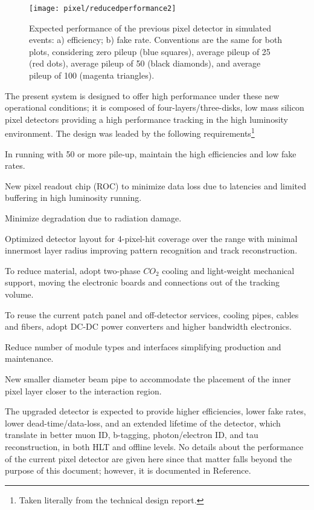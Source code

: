 \begin{figure}[!h]
\centering
\texttt{[image: pixel/reducedperformance2]}
\caption[Expected performance of the previous pixel detector in simulated \ttbar events.]{Expected performance of the previous pixel detector in simulated \ttbar events: a) efficiency; b) fake rate. Conventions are the same for both plots, considering zero pileup (blue squares), average pileup of 25 (red dots), average pileup of 50 (black diamonds), and average pileup of 100 (magenta triangles).}\label{fig:reduced_performance}
\end{figure}

The present system is designed to offer high performance under these new operational conditions; it is composed of four-layers/three-disks, low mass silicon pixel detectors providing a high performance tracking in the high luminosity environment. The design was leaded by the following requirements\footnote{Taken literally from the technical design report.} 
\bit
\item In running with 50 or more pile-up, maintain the high efficiencies and low fake rates.
\item New pixel readout chip (ROC) to minimize data loss due to latencies and limited buffering in high luminosity running.
\item Minimize degradation due to radiation damage.
\item Optimized detector layout for 4-pixel-hit coverage over the \etac range with minimal innermost layer radius improving pattern recognition and track reconstruction.
\item To reduce material, adopt two-phase $CO_2$ cooling and light-weight mechanical support, moving the electronic boards and connections out of the tracking volume.
\item To reuse the current patch panel and off-detector services, cooling pipes, cables and fibers, adopt DC-DC power converters and higher bandwidth electronics.
\item Reduce number of module types and interfaces simplifying production and maintenance.
\item New smaller diameter beam pipe to accommodate the placement of the inner pixel layer closer to the interaction region.
\eit

The upgraded detector is expected to provide higher efficiencies, lower fake rates, lower dead-time/data-loss, and an extended lifetime of the detector, which translate in better muon ID, b-tagging, photon/electron ID, and tau reconstruction, in both HLT and offline levels. No details about the performance of the current pixel detector are given here since that matter falls beyond the purpose of this document; however, it is documented in Reference\cite{pixel_performance}.

